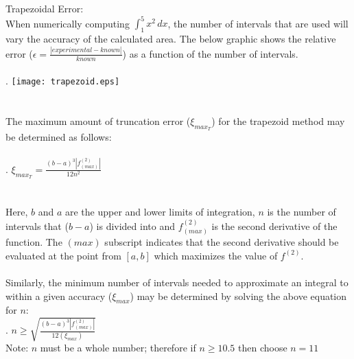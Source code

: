 \documentclass{report}
\begin{document}
\begin{enumerate}
\\
\\Trapezoidal Error: 
\\
When numerically computing $\displaystyle\int^5_1x^2\,dx$, the number of intervals that are used will vary the accuracy of the calculated area. The below graphic shows the relative error ($\epsilon = \frac{\left|experimental - known\right|}{known}$) as a function of the number of intervals.
\\
\\.\hspace{10 mm} \texttt{[image: trapezoid.eps]}
\\
\\
\\The maximum amount of truncation error ($\xi_{max_{T}}$) for the trapezoid method may be determined as follows:
\\
\\
. \hspace{20 mm} $\displaystyle \xi_{max_{T}} = \frac{(b-a)^{3}\left|f^{(2)}_{(max)}\right|}{12n^2}$ 
\\
\\
\\Here, $\displaystyle b$ and $\displaystyle a$ are the upper and lower limits of integration, $\displaystyle n$ is the number of intervals that ($b-a$) is divided into and $f^{(2)}_{(max)}$ is the second derivative of the function. The $(max)$ subscript indicates that the second derivative should be evaluated at the point from $\displaystyle [a,b]$ which maximizes the value of $f^{(2)}$.
\\
\\Similarly, the minimum number of intervals needed to approximate an integral to within a given accuracy ($\xi_{max}$) may be determined by solving the above equation for $\displaystyle n$: 
\\
. \hspace{25 mm} $\displaystyle n \geq \sqrt{\frac{(b-a)^{3}\left|f^{(2)}_{(max)}\right|}{12(\xi_{max})}} $
\\Note: $\displaystyle n$ must be a whole number; therefore if $n \geq 10.5$ then choose $n = 11$



\end{enumerate}
\end{document}
